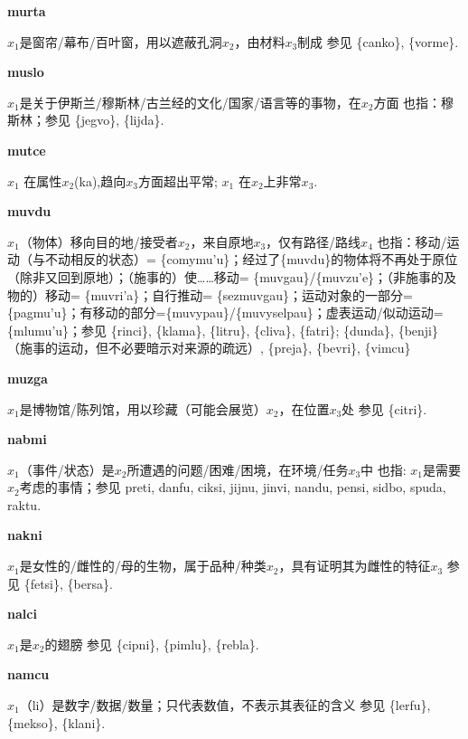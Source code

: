 \documentclass[notitlepage,twocolumn,a4paper,10pt]{book}
\begin{document}
{\sffamily\bfseries murta}\enspace {\ttfamily\bfseries[mur     mu'a]}  $x_1$是窗帘\slash{}幕布\slash{}百叶窗，用以遮蔽孔洞$x_2$，由材料$x_3$制成 \textemdash{} 参见 \{canko\}, \{vorme\}.

{\sffamily\bfseries muslo}\enspace {\ttfamily\bfseries[mus]}  $x_1$是关于伊斯兰\slash{}穆斯林\slash{}古兰经的文化\slash{}国家\slash{}语言等的事物，在$x_2$方面 \textemdash{} 也指：穆斯林；参见 \{jegvo\}, \{lijda\}.

{\sffamily\bfseries mutce}\enspace {\ttfamily\bfseries[    tce]}  $x_1$ 在属性$x_2$(ka),趋向$x_3$方面超出平常; $x_1$ 在$x_2$上非常$x_3$.

{\sffamily\bfseries muvdu}\enspace {\ttfamily\bfseries[muv     mu'u]}  $x_1$（物体）移向目的地\slash{}接受者$x_2$，来自原地$x_3$，仅有路径\slash{}路线$x_4$ \textemdash{} 也指：移动\slash{}运动（与不动相反的状态）= \{comymu'u\}；经过了\{muvdu\}的物体将不再处于原位（除非又回到原地）；（施事的）使……移动= \{muvgau\}\slash{}\{muvzu'e\}；（非施事的及物的）移动= \{muvri'a\}；自行推动= \{sezmuvgau\}；运动对象的一部分=\{pagmu'u\}；有移动的部分=\{muvypau\}\slash{}\{muvyselpau\}；虚表运动\slash{}似动运动= \{mlumu'u\}；参见 \{rinci\}, \{klama\}, \{litru\}, \{cliva\}, \{fatri\}; \{dunda\}, \{benji\}（施事的运动，但不必要暗示对来源的疏远）, \{preja\}, \{bevri\}, \{vimcu\}

{\sffamily\bfseries muzga}\enspace {\ttfamily\bfseries[muz]}  $x_1$是博物馆\slash{}陈列馆，用以珍藏（可能会展览）$x_2$，在位置$x_3$处 \textemdash{} 参见 \{citri\}.

{\sffamily\bfseries nabmi}\enspace {\ttfamily\bfseries[nam]}  $x_1$（事件\slash{}状态）是$x_2$所遭遇的问题\slash{}困难\slash{}困境，在环境\slash{}任务$x_3$中 \textemdash{} 也指: $x_1$是需要$x_2$考虑的事情；参见 {preti}, {danfu}, {ciksi}, {jijnu}, {jinvi}, {nandu}, {pensi}, {sidbo}, {spuda}, {raktu}.

{\sffamily\bfseries nakni}\enspace {\ttfamily\bfseries[nak]}  $x_1$是女性的\slash{}雌性的\slash{}母的生物，属于品种\slash{}种类$x_2$，具有证明其为雌性的特征$x_3$ \textemdash{} 参见 \{fetsi\}, \{bersa\}.

{\sffamily\bfseries nalci}\enspace {\ttfamily\bfseries[        na'i]}  $x_1$是$x_2$的翅膀 \textemdash{} 参见 \{cipni\}, \{pimlu\}, \{rebla\}.

{\sffamily\bfseries namcu}\enspace {\ttfamily\bfseries[nac     na'u]}  $x_1$（li）是数字\slash{}数据\slash{}数量；只代表数值，不表示其表征的含义 \textemdash{} 参见 \{lerfu\}, \{mekso\}, \{klani\}.
\end{document}
